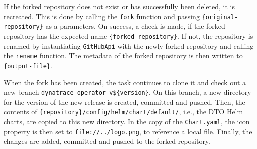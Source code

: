 If the forked repository does not exist or has successfully been deleted, it is recreated.
This is done by calling the \verb|fork| function and passing \verb|{original-repository}| as a parameters.
On success, a check is made, if the forked repository has the expected name \verb|{forked-repository}|.
If not, the repository is renamed by instantiating \verb|GitHubApi| with the newly forked repository and calling the \verb|rename| function.
The metadata of the forked repository is then written to \verb|{output-file}|.

When the fork has been created, the task continues to clone it and check out a new branch \verb|dynatrace-operator-v${version}|.
On this branch, a new directory for the version of the new release is created, committed and pushed.
Then, the contents of \verb|{repository}/config/helm/chart/default/|, i.e., the DTO Helm charts, are copied to this new directory.
In the copy of the \verb|Chart.yaml|, the icon property is then set to \verb|file://../logo.png|, to reference a local file.
Finally, the changes are added, committed and pushed to the forked repository.
